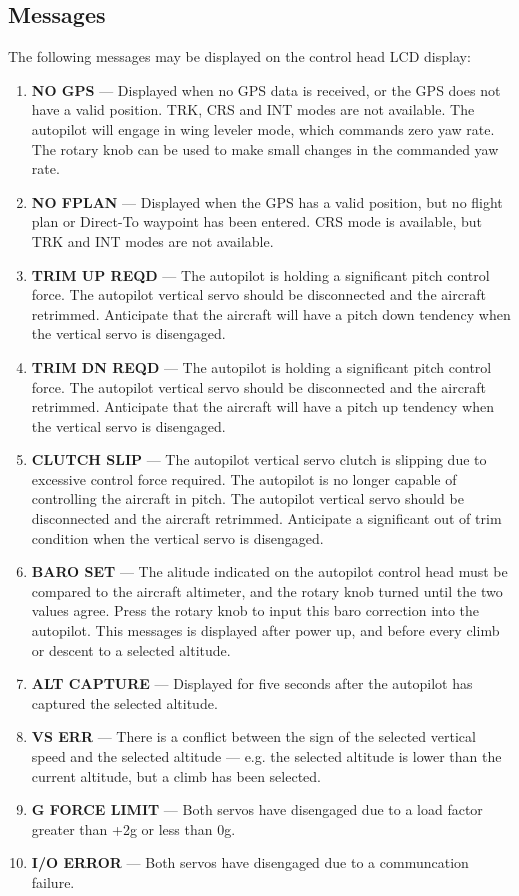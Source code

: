 \subsection*{Messages}
The following messages may be displayed on the control head LCD display:
\begin{enumerate}
\item \textbf{NO GPS} --- Displayed when no GPS data is received, or the GPS does not have a valid position. TRK, CRS and INT modes are not available. The autopilot will engage in wing leveler mode, which commands zero yaw rate. The rotary knob can be used to make small changes in the commanded yaw rate.
\item \textbf{NO FPLAN} --- Displayed when the GPS has a valid position, but no flight plan or Direct-To waypoint has been entered. CRS mode is available, but TRK and INT modes are not available.
\item \textbf{TRIM UP REQD} --- The autopilot is holding a significant pitch control force. The autopilot vertical servo should be disconnected and the aircraft retrimmed. Anticipate that the aircraft will have a pitch down tendency when the vertical servo is disengaged.
\item \textbf{TRIM DN REQD} --- The autopilot is holding a significant pitch control force. The autopilot vertical servo should be disconnected and the aircraft retrimmed. Anticipate that the aircraft will have a pitch up tendency when the vertical servo is disengaged.
\item \textbf{CLUTCH SLIP} --- The autopilot vertical servo clutch is slipping due to excessive control force required. The autopilot is no longer capable of controlling the aircraft in pitch. The autopilot vertical servo should be disconnected and the aircraft retrimmed. Anticipate a significant out of trim condition when the vertical servo is disengaged.
\item \textbf{BARO SET} --- The alitude indicated on the autopilot control head must be compared to the aircraft altimeter, and the rotary knob turned until the two values agree. Press the rotary knob to input this baro correction into the autopilot. This messages is displayed after power up, and before every climb or descent to a selected altitude.
\item \textbf{ALT CAPTURE} --- Displayed for five seconds after the autopilot has captured the selected altitude.
\item \textbf{VS ERR} --- There is a conflict between the sign of the selected vertical speed and the selected altitude --- e.g. the selected altitude is lower than the current altitude, but a climb has been selected.
\item \textbf{G FORCE LIMIT} --- Both servos have disengaged due to a load factor greater than +2g or less than 0g.
\item \textbf{I/O ERROR} --- Both servos have disengaged due to a communcation failure.
\end{enumerate}

